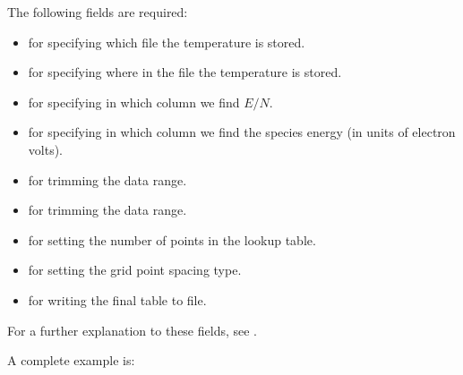 \documentclass[letterpaper,10pt,english]{sphinxmanual}
\begin{document}
\sphinxAtStartPar
The following fields are required:
\begin{itemize}
\item {} 
\sphinxAtStartPar
{} for specifying which file the temperature is stored.

\item {} 
\sphinxAtStartPar
{} for specifying where in the file the temperature is stored.

\item {} 
\sphinxAtStartPar
{} for specifying in which column we find \(E/N\).

\item {} 
\sphinxAtStartPar
{} for specifying in which column we find the species energy (in units of electron volts).

\item {} 
\sphinxAtStartPar
{} for trimming the data range.

\item {} 
\sphinxAtStartPar
{} for trimming the data range.

\item {} 
\sphinxAtStartPar
{} for setting the number of points in the lookup table.

\item {} 
\sphinxAtStartPar
{} for setting the grid point spacing type.

\item {} 
\sphinxAtStartPar
{} for writing the final table to file.

\end{itemize}

\sphinxAtStartPar
For a further explanation to these fields, see {\hyperref[\detokenize{Applications/CdrPlasmaModel:chap-cdrplasmajsonmobility}]{}}.

\sphinxAtStartPar
A complete example is:
\end{document}
